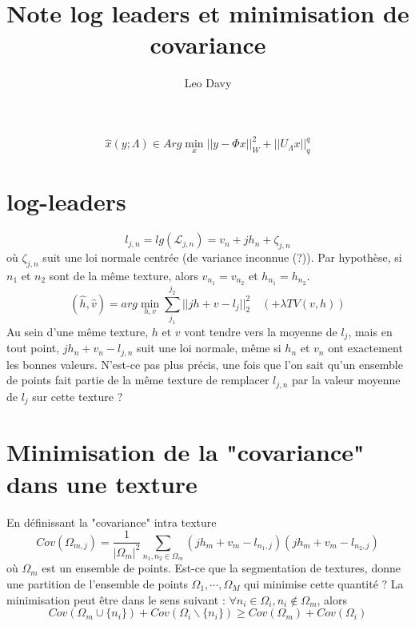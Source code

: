 \documentclass[11pt]{article} %
\title{Note log leaders et minimisation de covariance}
\author{Leo Davy}
\begin{document}
\maketitle
\begin{equation}
	\hat{x}(y;\Lambda) \in Arg\min_{x} ||y - \Phi x||_{W}^2 + ||U_\Lambda x||_q^q
\end{equation}

\section{log-leaders}
\begin{equation}
	l_{j,n} = lg(\mathcal{L}_{j,n}) = v_n + jh_n + \zeta_{j,n}
\end{equation}
où $\zeta_{j,n}$ suit une loi normale centrée (de variance inconnue (?)).
Par hypothèse, si $n_1$ et $n_2$ sont de la même texture, alors $v_{n_1}=v_{n_2}$ et $h_{n_1} = h_{n_2}$.
\begin{equation}
	(\hat{h}, \hat{v}) = arg\min_{h,v} \sum_{j_1}^{j_2} ||jh + v - l_j||_2^2 \quad (+\lambda TV(v,h))
\end{equation}
Au sein d'une même texture, $h$ et $v$ vont tendre vers la moyenne de $l_j$, mais en tout point, $jh_n + v_n - l_{j,n}$ suit une loi normale, même si $h_n$ et $v_n$ ont exactement les bonnes valeurs.
\newline
N'est-ce pas plus précis, une fois que l'on sait qu'un ensemble de points fait partie de la même texture de remplacer $l_{j,n}$ par la valeur moyenne de $l_j$ sur cette texture ? 

\section{Minimisation de la "covariance" dans une texture}
En définissant la "covariance" intra texture
\begin{equation}
	Cov(\Omega_{m,j}) =  \frac{1}{|\Omega_m|^2}\sum_{n_1,n_2\in\Omega_m} (jh_m + v_m  - l_{n_1,j})(j h_m + v_m - l_{n_2, j})
\end{equation}
où $\Omega_m$ est un ensemble de points.
\newline
Est-ce que la segmentation de textures, donne une partition de l'ensemble de points $\Omega_1, \cdots, \Omega_M$ qui minimise cette quantité ?
\newline
La minimisation peut être dans le sens suivant : $\forall n_i \in \Omega_i, n_i \not\in\Omega_m$, alors
\begin{equation}
	Cov(\Omega_m\cup \{n_i\}) + Cov(\Omega_i \backslash \{n_i\}) \geq Cov(\Omega_m) + Cov(\Omega_i)
\end{equation}
\end{document}
